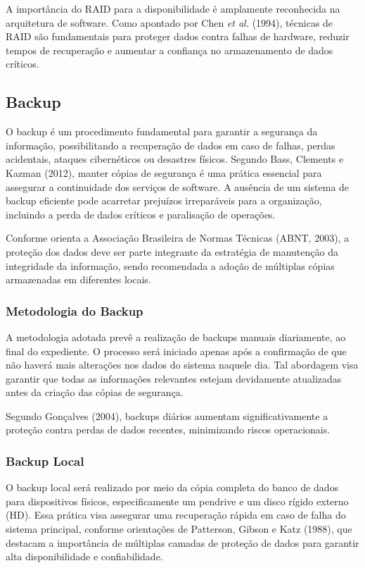 \documentclass[../main.tex]{subfiles}
\begin{document}
    A importância do RAID para a disponibilidade é amplamente reconhecida na arquitetura de software. Como apontado por Chen \textit{et al.} (1994), 
    técnicas de RAID são fundamentais para proteger dados contra falhas de hardware, reduzir tempos de recuperação e aumentar a 
    confiança no armazenamento de dados críticos.

\subsection{Backup}
O backup é um procedimento fundamental para garantir a segurança da informação, possibilitando a recuperação de dados em caso de falhas, 
perdas acidentais, ataques cibernéticos ou desastres físicos. Segundo Bass, Clements e Kazman (2012), manter cópias de segurança é uma 
prática essencial para assegurar a continuidade dos serviços de software. A ausência de um sistema de backup eficiente pode acarretar 
prejuízos irreparáveis para a organização, incluindo a perda de dados críticos e paralisação de operações.

Conforme orienta a Associação Brasileira de Normas Técnicas (ABNT, 2003), a proteção dos dados deve ser parte integrante da estratégia 
de manutenção da integridade da informação, sendo recomendada a adoção de múltiplas cópias armazenadas em diferentes locais.
    \subsubsection{Metodologia do Backup}

    A metodologia adotada prevê a realização de backups manuais diariamente, ao final do expediente. O processo será iniciado apenas 
    após a confirmação de que não haverá mais alterações nos dados do sistema naquele dia. Tal abordagem visa garantir que todas as 
    informações relevantes estejam devidamente atualizadas antes da criação das cópias de segurança.

    Segundo Gonçalves (2004), backups diários aumentam significativamente a proteção contra perdas de dados recentes, minimizando 
    riscos operacionais.

    \subsubsection{Backup Local}

    O backup local será realizado por meio da cópia completa do banco de dados para dispositivos físicos, especificamente um 
    pendrive e um disco rígido externo (HD). Essa prática visa assegurar uma recuperação rápida em caso de falha do sistema principal, 
    conforme orientações de Patterson, Gibson e Katz (1988), que destacam a importância de múltiplas camadas de proteção de dados para 
    garantir alta disponibilidade e confiabilidade.
\end{document}
